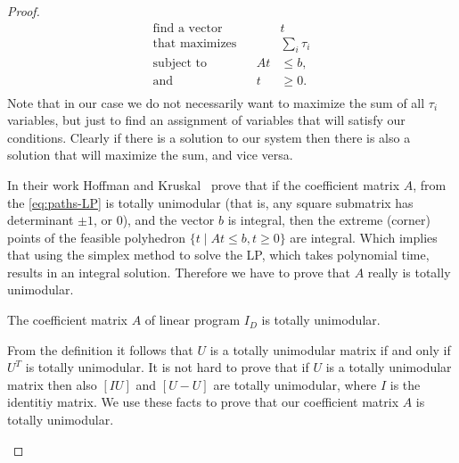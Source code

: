 \documentclass[a4paper,UKenglish,cleveref, autoref, thm-restate]{lipics-v2021}
\begin{document}
\begin{proof}
\begin{equation} \label{eq:paths-LP}
\begin{aligned}
\text{find a vector} &&& t \\
\text{that maximizes} &&& \sum_i \tau_i \\
\text{subject to} && A t  &\leq b, \\
\text{and} && t &\geq 0. \\
\end{aligned}
\end{equation}
Note that in our case we do not necessarily want to maximize the sum of all $\tau_i$ variables, but just to find an assignment of variables that will satisfy our conditions. Clearly if there is a solution to our system then there is also a solution that will maximize the sum, and vice versa. 

In their work Hoffman and Kruskal~\cite{Hoffman1956Integral} prove that if the coefficient matrix  $A$, from the \cref{eq:paths-LP} is totally unimodular (that is, any square submatrix has determinant $\pm 1$, or $0$), and the vector $b$ is integral,
then the extreme (corner) points of the feasible polyhedron $\{ t \mid A t  \leq b, t \geq 0\}$ are integral. 
Which implies that using the simplex method to solve the LP, which takes polynomial time, results in an integral solution.
Therefore we have to prove that $A$ really is totally unimodular.

\begin{claim}
    The coefficient matrix $A$ of linear program $I_D$ is totally unimodular.
\end{claim}

\begin{claimproof}
    From the definition it follows that $U$ is a totally unimodular matrix if and only if $U^T$ is totally unimodular.
    It is not hard to prove that if $U$ is a totally unimodular matrix then also $[I U]$ and $[U -U]$ are totally unimodular, where $I$ is the identitiy matrix.
    We use these facts to prove that our coefficient matrix $A$ is totally unimodular.


\end{claimproof}
\end{proof}
\end{document}
